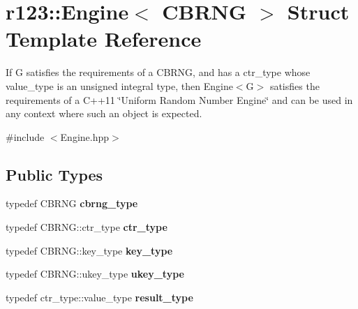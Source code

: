\hypertarget{structr123_1_1Engine}{}\section{r123\+:\+:Engine$<$ C\+B\+R\+NG $>$ Struct Template Reference}
\label{structr123_1_1Engine}


If G satisfies the requirements of a C\+B\+R\+NG, and has a ctr\+\_\+type whose value\+\_\+type is an unsigned integral type, then Engine$<$\+G$>$ satisfies the requirements of a C++11 \char`\"{}\+Uniform Random Number Engine\char`\"{} and can be used in any context where such an object is expected.  




{\ttfamily \#include $<$Engine.\+hpp$>$}

\subsection*{Public Types}
\begin{DoxyCompactItemize}
\item 
\hypertarget{structr123_1_1Engine_a45ee0086cf8cd6d10febb76dc88f8b22}{}\label{structr123_1_1Engine_a45ee0086cf8cd6d10febb76dc88f8b22} 
typedef C\+B\+R\+NG {\bfseries cbrng\+\_\+type}
\item 
\hypertarget{structr123_1_1Engine_a96e0f5f039d5efd6aae77b63bafaad90}{}\label{structr123_1_1Engine_a96e0f5f039d5efd6aae77b63bafaad90} 
typedef C\+B\+R\+N\+G\+::ctr\+\_\+type {\bfseries ctr\+\_\+type}
\item 
\hypertarget{structr123_1_1Engine_a18132a79d2327990c4809b37300eddc3}{}\label{structr123_1_1Engine_a18132a79d2327990c4809b37300eddc3} 
typedef C\+B\+R\+N\+G\+::key\+\_\+type {\bfseries key\+\_\+type}
\item 
\hypertarget{structr123_1_1Engine_a32973bdda8697bcbb4dde11c0366a5e3}{}\label{structr123_1_1Engine_a32973bdda8697bcbb4dde11c0366a5e3} 
typedef C\+B\+R\+N\+G\+::ukey\+\_\+type {\bfseries ukey\+\_\+type}
\item 
\hypertarget{structr123_1_1Engine_a3d7cb66d43f99f5e227990af985ecb45}{}\label{structr123_1_1Engine_a3d7cb66d43f99f5e227990af985ecb45} 
typedef ctr\+\_\+type\+::value\+\_\+type {\bfseries result\+\_\+type}
\end{DoxyCompactItemize}
